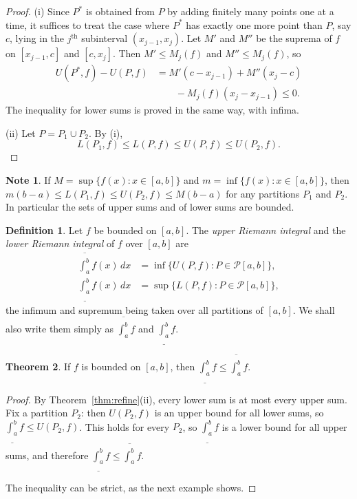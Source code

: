 \documentclass[11pt,a4paper]{article}
\numberwithin{equation}{section}
\theoremstyle{definition}
\newtheorem{thm}{Theorem}[subsection]
\newtheorem{defn}[thm]{Definition}
\newtheorem*{note}{Note}
\begin{document}
\begin{proof}
(i) Since $P^*$ is obtained from $P$ by adding finitely many points one at a time, it suffices to treat the case where $P^*$ has exactly one more point than $P$, say $c$, lying in the $j^{\text{th}}$ subinterval $(x_{j-1},x_j)$. Let $M'$ and $M''$ be the suprema of $f$ on $[x_{j - 1}, c]$ and $[c,x_j]$. Then $M'\leq M_j(f)$ and $M''\leq M_j(f)$, so
\begin{align*}
U(P^*, f) - U(P,f) &= M'(c - x_{j - 1}) + M''(x_j - c)\\
&\qquad - M_j(f)(x_j - x_{j-1}) \leq 0 .
\end{align*}
The inequality for lower sums is proved in the same way, with infima.

(ii) Let $P = P_1\cup P_2$. By (i),
$$L(P_1,f) \leq L(P,f) \leq U(P,f) \leq U(P_2,f) .$$
\end{proof}

\begin{note}
If $M = \sup \{f(x): x\in [a,b]\}$ and $m = \inf \{f(x): x\in [a,b]\}$, then $m(b-a)\leq L(P_1,f) \leq U(P_2,f)\leq M(b-a)$ for any partitions $P_1$ and $P_2$. In particular the sets of upper sums and of lower sums are bounded.
\end{note}


\begin{defn}
Let $f$ be bounded on $[a,b]$. The \emph{upper Riemann integral} and the \emph{lower Riemann integral} of $f$ over $[a,b]$ are
\begin{align*}
\overline{\int^b_a}f(x)\, dx &= \inf \{U(P,f): P\in \mathcal{P}[a,b]\},\\
\underline{\int^b_a}f(x)\, dx &= \sup \{L(P,f): P\in \mathcal{P}[a,b]\},
\end{align*}
the infimum and supremum being taken over all partitions of $[a,b]$. We shall also write them simply as $\overline{\int^b_a} f$ and $\underline{\int^b_a} f$.
\end{defn}


\begin{thm}
If $f$ is bounded on $[a,b]$, then $\displaystyle\underline{\int^b_a} f \leq \overline{\int^b_a} f$.
\end{thm}

\begin{proof}
By Theorem~\ref{thm:refine}(ii), every lower sum is at most every upper sum. Fix a partition $P_2$: then $U(P_2,f)$ is an upper bound for all lower sums, so $\underline{\int^b_a} f\leq U(P_2,f)$. This holds for every $P_2$, so $\underline{\int^b_a} f$ is a lower bound for all upper sums, and therefore $\underline{\int^b_a} f\leq\overline{\int^b_a} f$.

The inequality can be strict, as the next example shows.
\end{proof}
\end{document}
